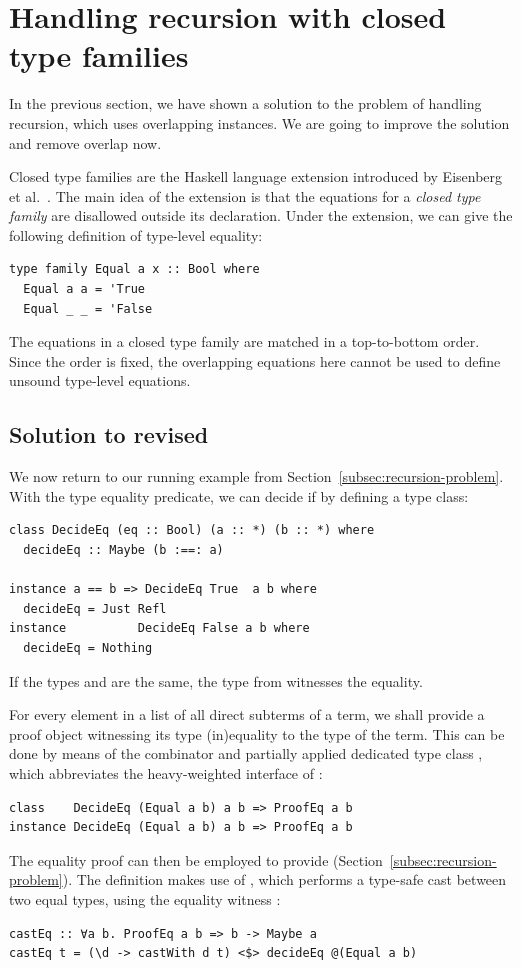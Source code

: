 \documentclass[sigplan,screen,review,anonymous]{acmart}
\begin{document}
\section{Handling recursion with closed type families}
\label{sec:handling-recursion}


In the previous section, we have shown a solution to the problem of handling recursion, which uses overlapping instances. We are going to improve the solution and remove overlap now.

Closed type families are the Haskell language extension introduced by Eisenberg et al.~\cite{Eisenberg2014}. The main idea of the extension is that the equations for a \emph{closed type family} are disallowed outside its declaration. Under the extension, we can give the following definition of type-level equality:
\begin{lstlisting}[style=fancy]
type family Equal a x :: Bool where
  Equal a a = 'True
  Equal _ _ = 'False
\end{lstlisting}
The equations in a closed type family are matched in a top-to-bottom order. Since the order is fixed, the overlapping equations here cannot be used to define unsound type-level equations.

\subsection{Solution to  revised}
\label{subsec:solve-subterms}

We now return to our running example from Section~\ref{subsec:recursion-problem}. With the type equality predicate, we can decide if  by defining a type class:
\begin{lstlisting}[style=fancy]
class DecideEq (eq :: Bool) (a :: *) (b :: *) where
  decideEq :: Maybe (b :==: a)

instance a == b => DecideEq True  a b where
  decideEq = Just Refl
instance          DecideEq False a b where
  decideEq = Nothing
\end{lstlisting}
If the types  and  are the same, the \K{:==:} type from  witnesses the equality.

For every element in a list of all direct subterms of a term, we shall provide a proof object witnessing its type (in)equality to the type of the term. This can be done by means of the  combinator and partially applied dedicated type class , which abbreviates the heavy-weighted interface of :
\begin{lstlisting}[style=fancy]
class    DecideEq (Equal a b) a b => ProofEq a b
instance DecideEq (Equal a b) a b => ProofEq a b
\end{lstlisting}
The equality proof can then be employed to provide  (Section~\ref{subsec:recursion-problem}). The definition makes use of , which performs a type-safe cast between two equal types, using the equality witness :
\begin{lstlisting}[style=fancy]
castEq :: ∀a b. ProofEq a b => b -> Maybe a
castEq t = (\d -> castWith d t) <$> decideEq @(Equal a b)
\end{lstlisting}
\end{document}

